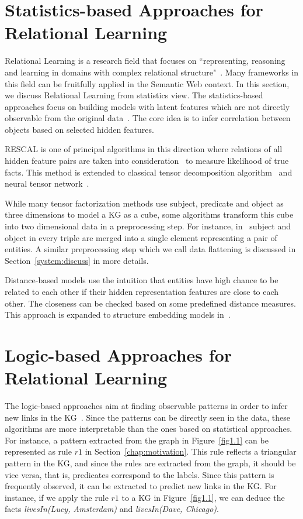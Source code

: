 \section{Statistics-based Approaches for Relational Learning}

Relational Learning is a research field that focuses on ``representing, reasoning and learning in domains with complex relational structure"~\cite{ref43}. Many frameworks in this field can be fruitfully applied in the Semantic Web context. In this section, we discuss Relational Learning from statistics view. The statistics-based approaches focus on building models with latent features which are not directly observable from the original data~\cite{ref1}. The core idea is to infer correlation between objects based on selected hidden features.

RESCAL is one of principal algorithms in this direction where relations of all hidden feature pairs are taken into consideration~\cite{ref2, ref3} to measure likelihood of true facts. This method is extended to classical tensor decomposition algorithm~\cite{ref4} and neural tensor network~\cite{ref5}.

While many tensor factorization methods use subject, predicate and object as three dimensions to model a KG as a cube, some algorithms transform this cube into two dimensional data in a preprocessing step. For instance, in~\cite{ref6, ref7} subject and object in every triple are merged into a single element representing a pair of entities. A similar preprocessing step which we call data flattening is discussed in Section~\ref{system:discuss} in more details.

Distance-based models use the intuition that entities have high chance to be related to each other if their hidden representation features are close to each other. The closeness can be checked based on some predefined distance measures. This approach is expanded to structure embedding models in~\cite{ref8}.

\section{Logic-based Approaches for Relational Learning}

The logic-based approaches aim at finding observable patterns in order to infer new links in the KG~\cite{ref1}. Since the patterns can be directly seen in the data, these algorithms are more interpretable than the ones based on statistical approaches. For instance, a pattern extracted from the graph in Figure~\ref{fig1.1} can be represented as rule $r1$ in Section~\ref{chap:motivation}. This rule reflects a triangular pattern in the KG, and since the rules are extracted from the graph, it should be vice versa, that is, predicates correspond to the labels. Since this pattern is frequently observed, it can be extracted to predict new links in the KG. For instance, if we apply the rule $r1$ to a KG in Figure~\ref{fig1.1}, we can deduce the facts \textit{livesIn(Lucy, Amsterdam)} and \textit{livesIn(Dave, Chicago)}.

